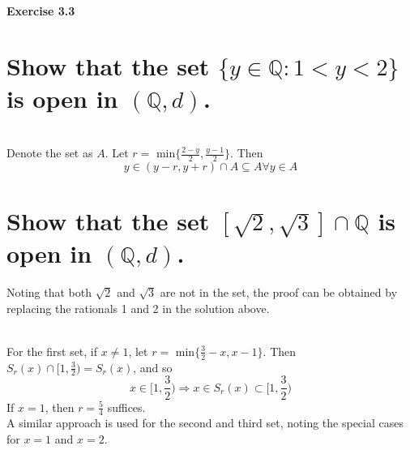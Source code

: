 \subsection{Exercise 3.3}
\setcounter{question}{0}


\begin{parts}
 
 \part{Show that the set $\{y \in \mathbb{Q}:1 < y < 2\}$ is open in $(\mathbb{Q},d)$.}
 
 
\begin{solution}
 \\Denote the set as $A$. Let $r =$ min$\{\frac{2-y}{2},\frac{y-1}{2}\}$. Then
 $$y \in (y-r,y+r) \cap A \subseteq A \forall y \in A$$
\end{solution}

\part{Show that the set $[\sqrt{2},\sqrt{3}]\cap \mathbb{Q}$ is open in $(\mathbb{Q},d)$.}

\begin{solution}
 Noting that both $\sqrt{2}$ and $\sqrt{3}$ are not in the set, the proof can be obtained by replacing the rationals 1 and 2 in the solution above.
\end{solution}
\end{parts}


\begin{solution}
 \\For the first set, if $x \neq 1$, let $r =$ min$\{\frac{3}{2}-x,x-1\}$. Then $S_r(x) \cap [1,\frac{3}{2}) = S_r(x)$, and so
 $$x \in [1,\frac{3}{2}) \Rightarrow x \in S_r(x) \subset [1,\frac{3}{2})$$
 If $x = 1$, then $r = \frac{5}{4}$ suffices. \\
 A similar approach is used for the second and third set, noting the special cases for $x=1$ and $x=2$.
\end{solution}


